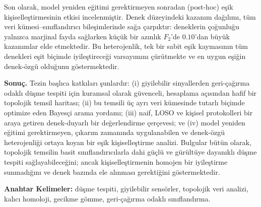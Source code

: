 Son olarak, model yeniden eğitimi gerektirmeyen sonradan (post-hoc) eşik
kişiselleştirmesinin etkisi incelenmiştir. Denek düzeyindeki kazanım dağılımı, tüm veri
kümesi--sınıflandırıcı bileşimlerinde sağa çarpıktır: deneklerin çoğunluğu yalnızca
marjinal fayda sağlarken küçük bir azınlık $F_2$'de $0.10$'dan büyük kazanımlar elde
etmektedir. Bu heterojenlik, tek bir sabit eşik kaymasının tüm denekleri eşit biçimde
iyileştireceği varsayımını çürütmekte ve en uygun eşiğin denek-özgü olduğunu
göstermektedir.

\vspace{2mm}
\noindent\textbf{Sonuç.}
Tezin başlıca katkıları şunlardır: (i) giyilebilir sinyallerden geri-çağırma odaklı
düşme tespiti için kuramsal olarak güvenceli, hesaplama açısından hafif bir topolojik
temsil haritası; (ii) bu temsili üç ayrı veri kümesinde tutarlı biçimde optimize eden
Bayesçi arama yordamı; (iii) naif, LOSO ve kişisel protokolleri bir araya getiren
denek-duyarlı bir değerlendirme çerçevesi; ve (iv) model yeniden eğitimi gerektirmeyen,
çıkarım zamanında uygulanabilen ve denek-özgü heterojenliği ortaya koyan bir eşik
kişiselleştirme analizi. Bulgular bütün olarak, topolojik temsilin basit
sınıflandırıcılarla dahi güçlü ve gürültüye dayanıklı düşme tespiti sağlayabileceğini;
ancak kişiselleştirmenin homojen bir iyileştirme sunmadığını ve denek bazında ele
alınması gerektiğini göstermektedir.

\vspace{3mm}\noindent
\textbf{Anahtar Kelimeler:} düşme tespiti, giyilebilir sensörler, topolojik veri analizi,
kalıcı homoloji, gecikme gömme, geri-çağırma odaklı sınıflandırma.
